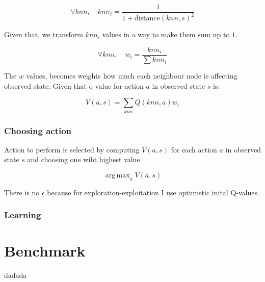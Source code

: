 \documentclass[12pt]{article}
\DeclareMathOperator*{\argmax}{arg\,max}
\begin{document}
\begin{equation}
\forall knn, \quad knn_i = \frac{1}{1+\text{distance}(knn, s)^2}
\end{equation}

Given that, we transform $knn_i$ values in a way to make them sum up to $1$.

\begin{equation}
\forall knn, \quad w_i = \frac{knn_i}{\sum knn_i}
\end{equation}

The $w$ values, becomes weights how much each neighbour node is affecting observed state. Given that q-value for action $a$ in observed state $s$ is:

\begin{equation}
V(a, s) = \sum_{knn} Q(knn, a)w_i
\end{equation}

\subsubsection{Choosing action}

Action to perform is selected by computing $V(a, s)$ for each action $a$ in observed state $s$ and choosing one wiht highest value.

\begin{equation}
\argmax_a V(a, s)
\end{equation}

There is no $\epsilon$ because for exploration-exploitation I use optimistic inital Q-values.

\subsubsection{Learning}

\section{Benchmark}
dadada
\end{document}
